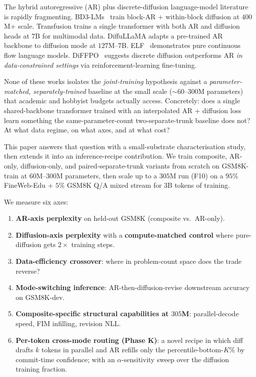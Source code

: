 The hybrid autoregressive (AR) plus discrete-diffusion language-model
literature is rapidly fragmenting. BD3-LMs~\citep{nie2025bd3} train
block-AR + within-block diffusion at $400$M+ scale. Transfusion
\citep{zhou2024transfusion} trains a single transformer with both AR
and diffusion heads at $7$B for multimodal data. DiffuLLaMA
\citep{gong2024diffullama} adapts a pre-trained AR backbone to
diffusion mode at $127$M--$7$B. ELF~\citep{chen2026elf} demonstrates
pure continuous flow language models. DiFFPO~\citep{wei2025diffpo}
suggests discrete diffusion outperforms AR \emph{in data-constrained
settings} via reinforcement-learning fine-tuning.

None of these works isolates the \emph{joint-training} hypothesis
against a \emph{parameter-matched, separately-trained} baseline at the
small scale ($\sim 60$--$300$M parameters) that academic and hobbyist
budgets actually access. Concretely: does a single shared-backbone
transformer trained with an interpolated AR + diffusion loss learn
something the same-parameter-count two-separate-trunk baseline does
not? At what data regime, on what axes, and at what cost?

This paper answers that question with a small-substrate
characterisation study, then extends it into an inference-recipe
contribution. We train composite, AR-only, diffusion-only, and
paired-separate-trunk variants from scratch on GSM8K-train
\citep{cobbe2021gsm8k} at $60$M--$300$M parameters, then scale up
to a $305$M run (F10) on a $95\%$ FineWeb-Edu + $5\%$ GSM8K Q/A
mixed stream for $3$B tokens of training.

We measure six axes:

\begin{enumerate}
  \item \textbf{AR-axis perplexity} on held-out GSM8K
        (composite vs.\ AR-only).
  \item \textbf{Diffusion-axis perplexity} with a
        \textbf{compute-matched control} where pure-diffusion gets
        $2\times$ training steps.
  \item \textbf{Data-efficiency crossover}: where in problem-count
        space does the trade reverse?
  \item \textbf{Mode-switching inference}: AR-then-diffusion-revise
        downstream accuracy on GSM8K-dev.
  \item \textbf{Composite-specific structural capabilities at $305$M}:
        parallel-decode speed, FIM infilling, revision NLL.
  \item \textbf{Per-token cross-mode routing (Phase K)}: a novel
        recipe in which diff drafts $k$ tokens in parallel and AR
        refills only the percentile-bottom-$K\%$ by commit-time
        confidence; with an $\alpha$-sensitivity sweep over the
        diffusion training fraction.
\end{enumerate}

